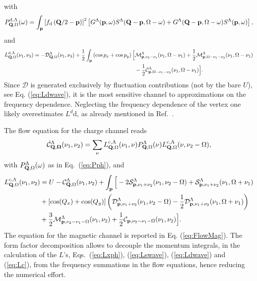 \begin{widetext}
\begin{equation}
\label{eq:dwaveflow}
\end{equation}
with
\begin{equation}
 P^{\mathrm{d},\Lambda}_{\mathbf{Q},\Omega}(\omega) =
 \int_{\mathbf{p}} \left[ f_{\mathrm{d}}\left( \mathbf{Q}/2 - \mathbf{p} \right) \right]^2 
\left[ G^{\Lambda}(\mathbf{p},\omega)S^{\Lambda}(\mathbf{Q}-\mathbf{p},\Omega-\omega) +G^{\Lambda}(\mathbf{Q}-\mathbf{p},\Omega-\omega)
S^{\Lambda}(\mathbf{p},\omega) \right], 
\label{eq:app:P_pp}
\end{equation} 
and
\begin{align} 
\label{eq:Ldwave}
 L^{\mathrm{d},\Lambda}_{\mathbf{Q},\Omega}(\nu_1,\nu_3) =
 -\mathcal{D}^{\Lambda}_{\mathbf{Q},\Omega}(\nu_1,\nu_3)
 + \frac{1}{2}\int_{\mathbf{p}} \left(\cos{p_x}+\cos{p_y}\right) \Big[ 
 & \mathcal{M}^{\Lambda}_{\mathbf{p},\nu_3-\nu_1}(\nu_1,\Omega-\nu_1) 
 + \frac{1}{2} \mathcal{M}^{\Lambda}_{\mathbf{p},\Omega-\nu_1-\nu_3}(\nu_1,\Omega-\nu_1)
 \\ \nonumber
 & - \frac{1}{2} \mathcal{C}^{\Lambda}_{\mathbf{p},\Omega-\nu_1-\nu_3}(\nu_1,\Omega-\nu_1) \Big].
\end{align} 
Since $\mathcal{D}$ is generated exclusively by fluctuation contributions (not by the bare $U$), see Eq. (\ref{eq:Ldwave}), it is the most sensitive channel to approximations on the frequency dependence.  
Neglecting the frequency dependence of the vertex one likely overestimates $L^d{\mathrm{d}}$, as already mentioned in Ref.~.

The flow equation for the charge channel reads
\begin{equation}
\dot{\mathcal{C}}^{\Lambda}_{\mathbf{Q,\Omega}}(\nu_1,\nu_2) = \sum_\nu
 L^{\mathrm{c},\Lambda}_{\mathbf{Q},\Omega}(\nu_1,\nu) P^{\Lambda}_{\mathbf{Q},\Omega}(\nu) 
 L^{\mathrm{c},\Lambda}_{\mathbf{Q},\Omega}(\nu,\nu_2-\Omega), 
\end{equation} 	   
with $P^{\Lambda}_{\mathbf{Q},\Omega}(\omega)$ as in Eq.~(\ref{eq:Pph}), and
\begin{align}  
 L^{\mathrm{c},\Lambda}_{\mathbf{Q},\Omega}(\nu_1,\nu_2) & =
 U - \mathcal{C}^{\Lambda}_{\mathbf{Q},\Omega}(\nu_1,\nu_2)
 + \int_{\mathbf{p}} \Big [
 - 2 \mathcal{S}^{\Lambda}_{\mathbf{p},\nu_1+\nu_2}(\nu_1,\nu_2-\Omega) + \mathcal{S}^{\Lambda}_{\mathbf{p},\nu_1+\nu_2}(\nu_1,\Omega+\nu_1)
 \nonumber \\ 
 & +  [\cos(Q_x)+\cos(Q_y)]\left( \mathcal{D}^{\Lambda}_{\mathbf{p},\nu_1+\nu_2}(\nu_1,\nu_2-\Omega) -\frac{1}{2} \mathcal{D}^{\Lambda}_{\mathbf{p},\nu_1+\nu_2}(\nu_1,\Omega+\nu_1) \right)
 \nonumber \\
 & + \frac{3}{2} \mathcal{M}^{\Lambda}_{\mathbf{p},\nu_2-\nu_1-\Omega}(\nu_1,\nu_2)
 + \frac{1}{2} \mathcal{C}_{\mathbf{p},\nu_2-\nu_1-\Omega}(\nu_1,\nu_2) \Big] .
 \label{eq:Lc}
\end{align}
The equation for the magnetic channel is reported in Eq. (\ref{eq:FlowMag}).
The form factor decomposition allows to decouple the momentum integrals, in the calculation of the $L$'s, Eqs.~(\ref{eq:Lxph}), (\ref{eq:Lswave}), (\ref{eq:Ldwave}) and (\ref{eq:Lc}), from the frequency summations in the flow equations, hence reducing the numerical effort.   	 


\end{widetext}
